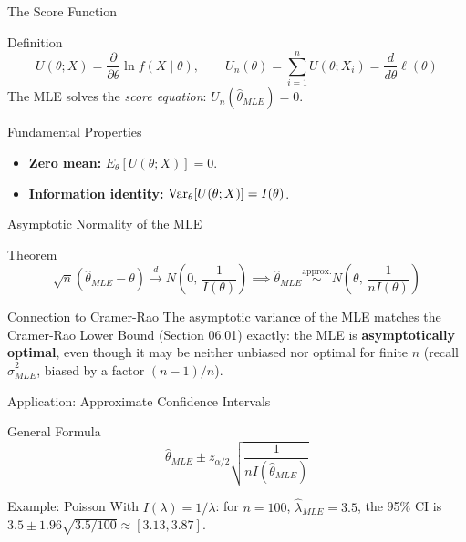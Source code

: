 \documentclass[aspectratio=169,xcolor={dvipsnames,table}]{beamer}
\begin{document}
\begin{frame}{The Score Function}
	\vspace{-0.15cm}
	\begin{block}{Definition}
		$$U(\theta;X) = \frac{\partial}{\partial\theta}\ln f(X\mid\theta), \qquad U_n(\theta) = \sum_{i=1}^n U(\theta;X_i) = \frac{d}{d\theta}\ell(\theta)$$
		The MLE solves the \emph{score equation}: $U_n(\hat\theta_{MLE})=0$.
	\end{block}
	\pause
	\vspace{0.1cm}
	\begin{alertblock}{Fundamental Properties}
		\begin{itemize}\itemsep=0.05cm
			\item \textbf{Zero mean:} $E_\theta[U(\theta;X)]=0$.
			\item \textbf{Information identity:} $\operatorname{Var}_\theta[U(\theta;X)] = I(\theta)$.
		\end{itemize}
	\end{alertblock}
\end{frame}

\begin{frame}{Asymptotic Normality of the MLE}
	\vspace{-0.15cm}
	\begin{block}{Theorem}
		$$\sqrt{n}(\hat\theta_{MLE}-\theta) \xrightarrow{d} N\!\left(0,\, \frac{1}{I(\theta)}\right) \implies \hat\theta_{MLE} \overset{\text{approx.}}{\sim} N\!\left(\theta,\, \frac{1}{nI(\theta)}\right)$$
	\end{block}
	\pause
	\vspace{0.1cm}
	\begin{alertblock}{Connection to Cramer-Rao}
		The asymptotic variance of the MLE matches the Cramer-Rao Lower Bound (Section 06.01) exactly: the MLE is \textbf{asymptotically optimal}, even though it may be neither unbiased nor optimal for finite $n$ (recall $\hat\sigma^2_{MLE}$, biased by a factor $(n-1)/n$).
	\end{alertblock}
\end{frame}

\begin{frame}{Application: Approximate Confidence Intervals}
	\vspace{-0.15cm}
	\begin{block}{General Formula}
		$$\hat\theta_{MLE} \pm z_{\alpha/2}\sqrt{\dfrac{1}{n I(\hat\theta_{MLE})}}$$
	\end{block}
	\pause
	\vspace{0.1cm}
	\begin{alertblock}{Example: Poisson}
		With $I(\lambda)=1/\lambda$: for $n=100$, $\hat\lambda_{MLE}=3.5$, the 95\% CI is $3.5 \pm 1.96\sqrt{3.5/100} \approx [3.13, 3.87]$.
	\end{alertblock}
\end{frame}
\end{document}
